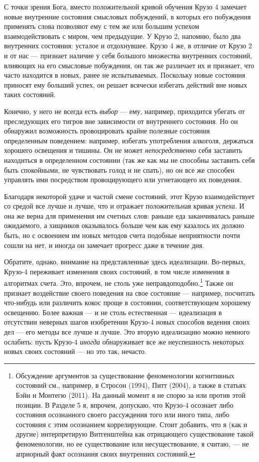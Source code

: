 \documentclass[11pt]{book}
\begin{document}
С точки зрения Бога, вместо положительной кривой обучения Крузо 4 замечает новые внутренние состояния смысловых побуждений, в которых его побуждения применять слова позволяют ему с тем же или большим успехом взаимодействовать с миром, чем предыдущие. У Крузо 2, напомню, было два внутренних состояния: усталое и отдохнувшее. Крузо 4 же, в отличие от Крузо 2 и от нас --- признает наличие у себя большого множества внутренних состояний, влияющих на его смысловые побуждения, он так же различает их и признает, что часто находится в новых, ранее не испытываемых. Поскольку новые состояния приносят ему больший успех, он решает всячески избегать действий вне новых таких состояний.

Конечно, у него не всегда есть \textit{выбор} --- ему, например, приходится убегать от преследующих его тигров вне зависимости от внутреннего состояния. Но он обнаружил возможность провоцировать крайне полезные состояния определенным поведением: например, избегать употребления алкоголя, держаться хорошего освещения и тишины. Он не может \textit{непосредственно} себя заставить находиться в определенном состоянии (так же как мы не способны заставить себя быть спокойными, не чувствовать голод и не спать), но он все же способен управлять ими посредством провоцирующего или угнетающего их поведения.

Благодаря некоторой удаче и частой смене состояний, этот Крузо взаимодействует со средой все лучше и лучше, что и отражает положительная кривая \textit{успеха}. И она же верна для применения им счетных слов: раньше еда заканчивалась раньше ожидаемого, а хищников оказывалось больше чем как ему казалось их должно быть, но с освоением им новых методов счета подобные неприятности почти сошли на нет, и иногда он замечает прогресс даже в течение дня.

Обратите, однако, внимание на представленные здесь идеализации. Во-первых, Крузо-4 переживает изменения своих состояний, в том числе изменения в алгоритмах счета. Это, впрочем, не столь уже неправдоподобно.\footnote{Обсуждение аргументов за существование феноменологии когнитивных состояний см., например, в Стросон (1994), Питт (2004), а также в статьях Бэйн и Монтегю (2011). На данный момент я не спорю за или против этой позиции. В Разделе 5 я, впрочем, допускаю, что Крузо-4 осознает либо состояния осознанного своего рассуждения того или иного типа, либо состояния с этим осознанием коррелирующие. Стоит добавить, что я (как и другие) интерпретирую Витгенштейна как отрицающего существование такой феноменологии, но ее существование или несуществование, я считаю, --- не априорный факт осознания своих внутренних состояний.} Также он признает воздействие своего поведения на свое состояние --- например, посчитать что-нибудь или различить кокос проще в состоянии, соответствующем хорошему освещению. Более важная --- и не столь естественная --- идеализация в отсутствии неверных шагов изобретении Крузо-4 новых способов ведения своих дел --- его методы все лучше и лучше. Это вторую идеализацию можно немного ослабить: пусть Крузо-4 \textit{иногда} обнаруживает все же неуспешность некоторых новых своих состояний --- но это так, нечасто.
\end{document}
